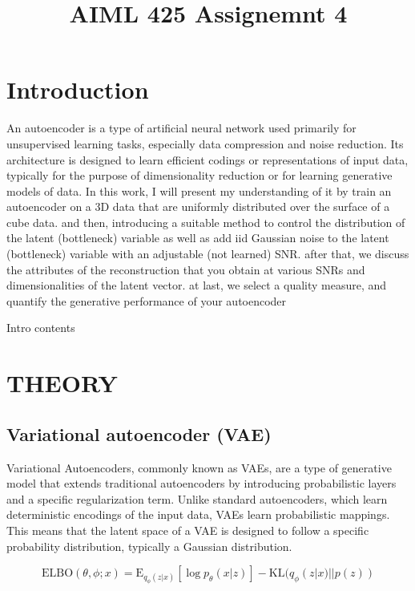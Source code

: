 \documentclass{article}
\title{AIML 425 Assignemnt 4}
\begin{document}
%
\maketitle
%
\section{Introduction}
\label{sec:intro}

An autoencoder is a type of artificial neural network used primarily for unsupervised learning tasks, especially data compression and noise reduction. Its architecture is designed to learn efficient codings or representations of input data, typically for the purpose of dimensionality reduction or for learning generative models of data.
In this work, I will present my understanding of it by train an autoencoder on a 3D data that are uniformly distributed over the surface of a cube data.
and then, introducing a suitable method to control the distribution of the latent (bottleneck) variable
as well as add iid Gaussian noise to the latent (bottleneck) variable with an adjustable
(not learned) SNR.
after that, we discuss the attributes of the reconstruction that you obtain at various SNRs
and dimensionalities of the latent vector.
at last, we select a quality measure, and quantify the generative performance of your autoencoder


Intro contents \cite{domingos2012few}

\section{THEORY}
\label{sec:theory}

\subsection{Variational autoencoder (VAE)}
\label{ssec:vae}

Variational Autoencoders, commonly known as VAEs, are a type of generative model that extends traditional autoencoders by introducing probabilistic layers and a specific regularization term. Unlike standard autoencoders, which learn deterministic encodings of the input data, VAEs learn probabilistic mappings. This means that the latent space of a VAE is designed to follow a specific probability distribution, typically a Gaussian distribution.

\begin{equation}
  \text{ELBO}(\theta, \phi; x) = \text{E}_{q_\phi(z|x)}[\log p_\theta(x|z)] - \text{KL}(q_\phi(z|x) || p(z))
  \end{equation}
  
\end{document}
